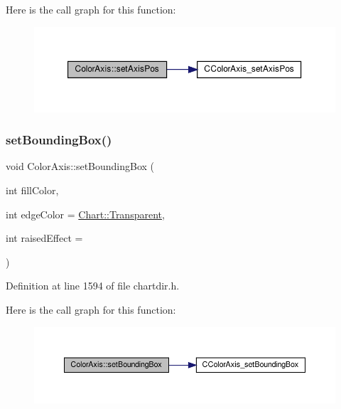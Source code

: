 Here is the call graph for this function\+:
\nopagebreak
\begin{figure}[H]
\begin{center}
\leavevmode
\includegraphics[width=350pt]{class_color_axis_aa1864826f904e5cdf34ecaaba55647a0_cgraph}
\end{center}
\end{figure}
\mbox{\label{class_color_axis_aa84a71cabd3bb3b6415fe6e94b7ba5eb}} 
\subsubsection{\texorpdfstring{set\+Bounding\+Box()}{setBoundingBox()}}
{\footnotesize\ttfamily void Color\+Axis\+::set\+Bounding\+Box (\begin{DoxyParamCaption}\item[{int}]{fill\+Color,  }\item[{int}]{edge\+Color = {\ttfamily \hyperlink{namespace_chart_abee0d882fdc9ad0b001245ad9fc64011afc6811800a9e2582dac0157b6279f836}{Chart\+::\+Transparent}},  }\item[{int}]{raised\+Effect = {} }\end{DoxyParamCaption})\hspace{0.3cm}{\ttfamily [inline]}}



Definition at line 1594 of file chartdir.\+h.

Here is the call graph for this function\+:
\nopagebreak
\begin{figure}[H]
\begin{center}
\leavevmode
\includegraphics[width=350pt]{class_color_axis_aa84a71cabd3bb3b6415fe6e94b7ba5eb_cgraph}
\end{center}
\end{figure}
\mbox{\label{class_color_axis_ad60effdecee5281b5f6ddbfdd234afa8}} 
